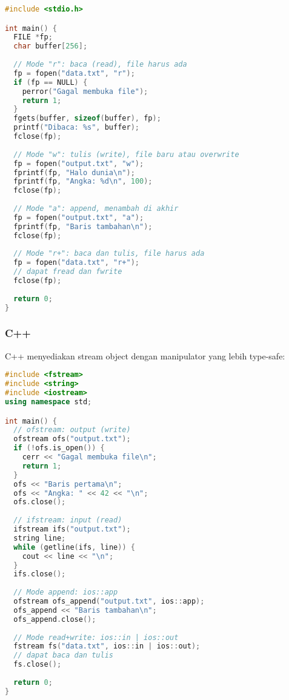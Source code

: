 \documentclass[../main.tex]{subfiles}
\begin{document}
\begin{lstlisting}[language=C, caption={Mode file teks di C}]
#include <stdio.h>

int main() {
  FILE *fp;
  char buffer[256];
  
  // Mode "r": baca (read), file harus ada
  fp = fopen("data.txt", "r");
  if (fp == NULL) {
    perror("Gagal membuka file");
    return 1;
  }
  fgets(buffer, sizeof(buffer), fp);
  printf("Dibaca: %s", buffer);
  fclose(fp);
  
  // Mode "w": tulis (write), file baru atau overwrite
  fp = fopen("output.txt", "w");
  fprintf(fp, "Halo dunia\n");
  fprintf(fp, "Angka: %d\n", 100);
  fclose(fp);
  
  // Mode "a": append, menambah di akhir
  fp = fopen("output.txt", "a");
  fprintf(fp, "Baris tambahan\n");
  fclose(fp);
  
  // Mode "r+": baca dan tulis, file harus ada
  fp = fopen("data.txt", "r+");
  // dapat fread dan fwrite
  fclose(fp);
  
  return 0;
}
\end{lstlisting}

\subsubsection{C++}
C++ menyediakan stream object dengan manipulator yang lebih type-safe:

\begin{lstlisting}[language=C++, caption={Mode file teks di C++}]
#include <fstream>
#include <string>
#include <iostream>
using namespace std;

int main() {
  // ofstream: output (write)
  ofstream ofs("output.txt");
  if (!ofs.is_open()) {
    cerr << "Gagal membuka file\n";
    return 1;
  }
  ofs << "Baris pertama\n";
  ofs << "Angka: " << 42 << "\n";
  ofs.close();
  
  // ifstream: input (read)
  ifstream ifs("output.txt");
  string line;
  while (getline(ifs, line)) {
    cout << line << "\n";
  }
  ifs.close();
  
  // Mode append: ios::app
  ofstream ofs_append("output.txt", ios::app);
  ofs_append << "Baris tambahan\n";
  ofs_append.close();
  
  // Mode read+write: ios::in | ios::out
  fstream fs("data.txt", ios::in | ios::out);
  // dapat baca dan tulis
  fs.close();
  
  return 0;
}
\end{lstlisting}
\end{document}
